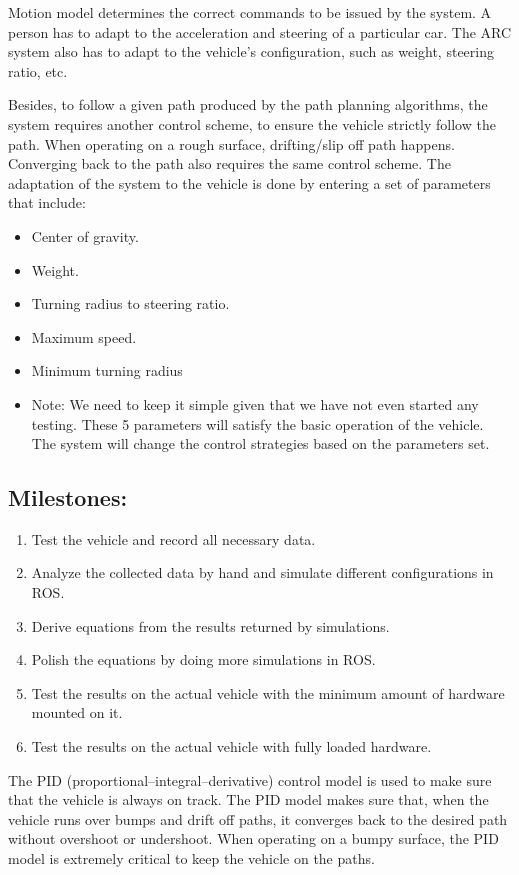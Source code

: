 \documentclass[compsoc,draftclsnofoot,onecolumn,10pt]{IEEEtran}
\begin{document}
Motion model determines the correct commands to be issued by the system. A person has to adapt to the acceleration and steering of a particular car. The ARC system also has to adapt to the vehicle’s configuration, such as weight, steering ratio, etc.\par
Besides, to follow a given path produced by the path planning algorithms, the system requires another control scheme, to ensure the vehicle strictly follow the path. When operating on a rough surface, drifting/slip off path happens. Converging back to the path also requires the same control scheme.
The adaptation of the system to the vehicle is done by entering a set of parameters that include:\par
\begin{itemize}
	\item Center of gravity.
	\item Weight.
	\item Turning radius to steering ratio.
	\item Maximum speed.
	\item Minimum turning radius
	\item Note: We need to keep it simple given that we have not even started any testing. These 5 parameters will satisfy the basic operation of the vehicle. The system will change the control strategies based on the parameters set.
\end{itemize}
\subsection{Milestones:}
\begin{enumerate}
	\item Test the vehicle and record all necessary data.
	\item Analyze the collected data by hand and simulate different configurations in ROS.
	\item Derive equations from the results returned by simulations.
	\item Polish the equations by doing more simulations in ROS.
	\item Test the results on the actual vehicle with the minimum amount of hardware mounted on it.
	\item Test the results on the actual vehicle with fully loaded hardware.
\end{enumerate}
The PID (proportional–integral–derivative) control model is used to make sure that the vehicle is always on track. The PID model makes sure that, when the vehicle runs over bumps and drift off paths, it converges back to the desired path without overshoot or undershoot. When operating on a bumpy surface, the PID model is extremely critical to keep the vehicle on the paths.\par
\end{document}
